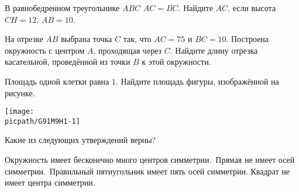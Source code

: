 \begin{homework}[number=1]
\begin{listofex}
		\item В равнобедренном треугольнике \( ABC \) \( AC=BC \). Найдите \( AC \), если высота \( CH=12 \), \( AB=10 \).
		\item На отрезке \( AB \) выбрана точка \( C \) так, что \( AC=75 \) и \( BC=10 \). Построена окружность с центром \( A \), проходящая через \( C \). Найдите длину отрезка касательной, проведённой из точки \( B \) к этой окружности.
		\item
		\begin{minipage}[t]{\bodywidth}
			Площадь одной клетки равна \( 1 \). Найдите площадь фигуры, изображённой на рисунке.
			\foranswer
		\end{minipage}
		\gapwidth
		\begin{minipage}[t]{\picwidth}
			\texttt{[image: \\picpath/G91M9H1-1]}
		\end{minipage}
		\item Какие из следующих утверждений верны?
		\begin{tasks}
			\task Окружность имеет бесконечно много центров симметрии.
			\task Прямая не имеет осей симметрии.
			\task Правильный пятиугольник имеет пять осей симметрии.
			\task Квадрат не имеет центра симметрии.
		\end{tasks}
	\end{listofex}
\end{homework}

